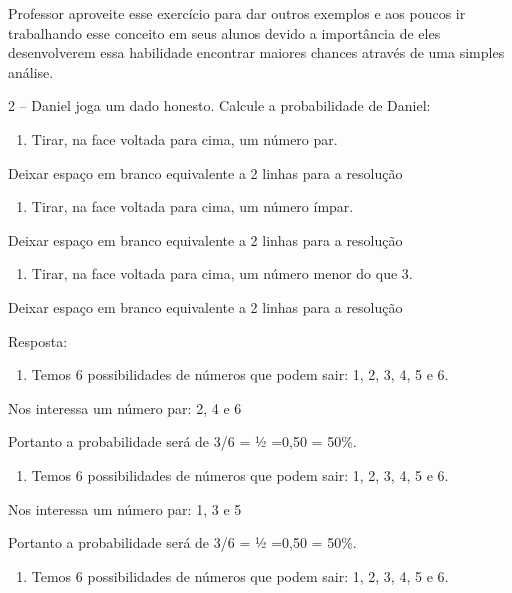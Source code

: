Professor aproveite esse exercício para dar outros exemplos e aos poucos
ir trabalhando esse conceito em seus alunos devido a importância de eles
desenvolverem essa habilidade encontrar maiores chances através de uma
simples análise.

2 -- Daniel joga um dado honesto. Calcule a probabilidade de Daniel:

\begin{enumerate}
\def\labelenumi{\alph{enumi})}
\item
  Tirar, na face voltada para cima, um número par.
\end{enumerate}

Deixar espaço em branco equivalente a 2 linhas para a resolução

\begin{enumerate}
\def\labelenumi{\alph{enumi})}
\item
  Tirar, na face voltada para cima, um número ímpar.
\end{enumerate}

Deixar espaço em branco equivalente a 2 linhas para a resolução

\begin{enumerate}
\def\labelenumi{\alph{enumi})}
\item
  Tirar, na face voltada para cima, um número menor do que 3.
\end{enumerate}

Deixar espaço em branco equivalente a 2 linhas para a resolução

Resposta:

\begin{enumerate}
\def\labelenumi{\alph{enumi})}
\item
  Temos 6 possibilidades de números que podem sair: 1, 2, 3, 4, 5 e 6.
\end{enumerate}

Nos interessa um número par: 2, 4 e 6

Portanto a probabilidade será de 3/6 = ½ =0,50 = 50\%.

\begin{enumerate}
\def\labelenumi{\alph{enumi})}
\item
  Temos 6 possibilidades de números que podem sair: 1, 2, 3, 4, 5 e 6.
\end{enumerate}

Nos interessa um número par: 1, 3 e 5

Portanto a probabilidade será de 3/6 = ½ =0,50 = 50\%.

\begin{enumerate}
\def\labelenumi{\alph{enumi})}
\item
  Temos 6 possibilidades de números que podem sair: 1, 2, 3, 4, 5 e 6.
\end{enumerate}

